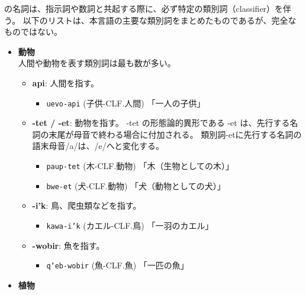 \langname の名詞は、指示詞や数詞と共起する際に、必ず特定の類別詞（classifier）を伴う。
以下のリストは、本言語の主要な類別詞をまとめたものであるが、完全なものではない。

\begin{itemize}
    \item \textbf{動物}\\
    人間や動物を表す類別詞は最も数が多い。
        \begin{itemize}
            \item \textbf{api}: 人間を指す。
                \begin{itemize}
                    \item \texttt{uevo-api} (子供-CLF.人間)
                    \quad 「一人の子供」
                \end{itemize}
            \item \textbf{-tet / -et}: 動物を指す。
            -tet の形態論的異形である -et は、先行する名詞の末尾が母音で終わる場合に付加される。
            類別詞-etに先行する名詞の語末母音/a/は、/e/へと変化する。
                \begin{itemize}
                    \item \texttt{paup-tet} (木-CLF.動物) %
                    \quad 「木（生物としての木）」
                    \item \texttt{bwe-et} (犬-CLF.動物) %
                    \quad 「犬（動物としての犬）」
                \end{itemize}
            \item \textbf{-i'k}: 鳥、爬虫類などを指す。
                \begin{itemize}
                    \item \texttt{kawa-i'k} (カエル-CLF.鳥) %
                    \quad 「一羽のカエル」
                \end{itemize}
            \item \textbf{-wobir}: 魚を指す。
                \begin{itemize}
                    \item \texttt{q'eb-wobir} (魚-CLF.魚) %
                    \quad 「一匹の魚」
                \end{itemize}
        \end{itemize}
    \item \textbf{植物} %

\end{itemize}
